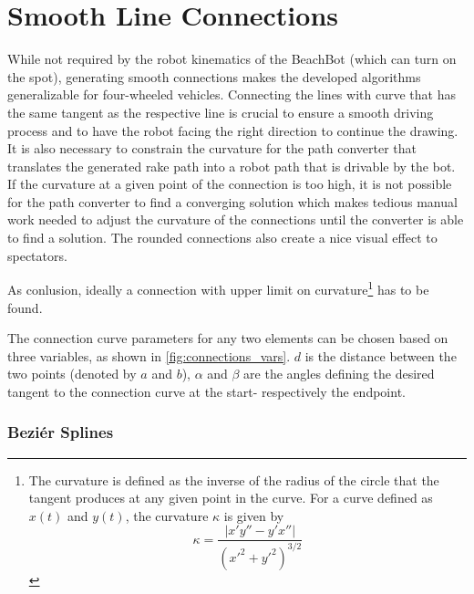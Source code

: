 \section{Smooth Line Connections}

While not required by the robot kinematics of the BeachBot (which can turn on the spot), generating smooth connections 
makes the developed algorithms generalizable for four-wheeled vehicles. Connecting the lines with curve that has the same tangent as the respective line is crucial to ensure a smooth driving process and to have the robot facing the right direction to continue the drawing.
It is also necessary to constrain the curvature for the path converter that translates the generated rake path into a robot path that is drivable by the bot. If the curvature at a given point of the connection is too high, it is not possible for the path converter to find a converging solution which makes tedious manual work needed to adjust the curvature of the connections until the converter is able to find a solution. The rounded connections also create a nice visual effect to spectators.

As conlusion, ideally a connection with upper limit on curvature\footnote{The curvature is defined as the inverse of the radius of the circle that the tangent produces at any given point in the curve. For a curve defined as $x(t)$ and $y(t)$, the curvature $\kappa$ is given by
\begin{equation}
\kappa = \frac{|x'y''-y'x''|}{(x'^2+y'^2)^{3/2}}
\end{equation}
} has to be found.

The connection curve parameters for any two elements can be chosen based on three variables, as shown in \autoref{fig:connections_vars}. $d$ is the distance between the two points (denoted by $a$ and $b$), $\alpha$ and $\beta$ are the angles defining the desired tangent to the connection curve at the start- respectively the endpoint.

\begin{figure}



\label{fig:connections_vars}
\end{figure}


\subsubsection{Beziér Splines}


